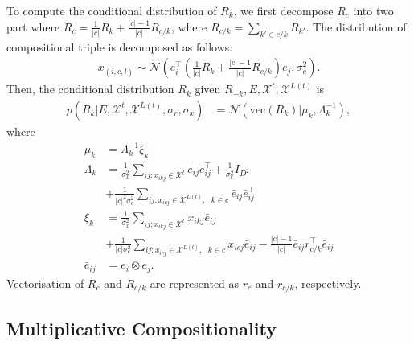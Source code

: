 To compute the conditional distribution of $R_k$, we first decompose $R_c$ into two part where $R_c =
\frac{1}{|c|} R_k + \frac{|c|-1}{|c|}R_{c/k}$, where $R_{c/k} = \sum_{k' \in c/k} R_{k'}$.
The distribution of compositional triple is decomposed as follows:
\begin{align}
x_{(i, c, l)} \sim \mathcal{N}(e_i^\top (\frac{1}{|c|} R_k + \frac{|c|-1}{|c|}R_{c/k}) e_j, \sigma_{c}^2).
\end{align}
Then, the conditional distribution $R_k$ given $R_{-k}, E, \mathcal{X}^{t}, \mathcal{X}^{L(t)}$ is
\begin{align}
\label{eqn:comp_cond_r}
p(R_k|E, \mathcal{X}^{t}, \mathcal{X}^{L(t)}, \sigma_r, \sigma_x)  &= \mathcal{N}(\text{vec}(R_k) | \mu_k,
\Lambda_k^{-1}),
\end{align}
where
\begin{align*}
\mu_k &=\Lambda_k^{-1}\xi_k \\
\Lambda_k &= \frac{1}{\sigma_x^2} \sum_{ij:x_{ikj} \in \mathcal{X}^{t}} \bar{e}_{ij}\bar{e}_{ij}^\top + \frac{1}
{\sigma_r^2} {I}_{D^2} \\
& +\frac{1}{|c|^2 \sigma_c^2} \sum_{ij:x_{icj} \in \mathcal{X}^{L(t)},\text{ }k \in c} \bar{e}_{ij} \bar{e}_{ij}^\top \\
\xi_k &=  \frac{1}{\sigma_x^2}\sum_{ij:x_{ikj} \in \mathcal{X}^{t}} x_{ikj} \bar{e}_{ij}\\
& +\frac{1}{|c| \sigma_c^2} \sum_{ij:x_{icj} \in \mathcal{X}^{L(t)},\text{ }k \in c} x_{icj} \bar{e}_{ij} - \frac{|c|-1}{|c|}
\bar{e}_{ij} r_{c/k}^\top \bar{e}_{ij}\\
\bar{e}_{ij} &= e_{i} \otimes e_{j}.
\end{align*}
Vectorisation of $R_c$ and $R_{c/k}$ are represented as $r_c$ and $r_{c/k}$, respectively.



\subsection{Multiplicative Compositionality}

